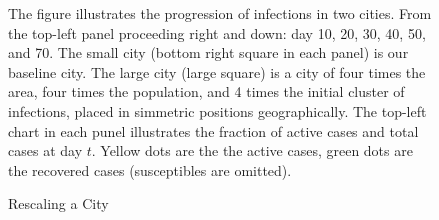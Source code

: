 \documentclass[english,11pt]{article}
\begin{document}
\begin{figure}[H]
\caption{Rescaling a City}
\begin{threeparttable}
\centering
{}
    \begin{tablenotes}
        \setlength{\itemindent}{-0.2em}
        \footnotesize
        \item
    The figure illustrates the progression of infections in two cities. From the top-left panel proceeding right and down: day 10, 20, 30, 40, 50, and 70. The small city (bottom right square in each panel) is our baseline city. The large city (large square) is a city of four times the area, four times the population, and 4 times the initial cluster of infections, placed in simmetric positions geographically. The top-left chart in each punel illustrates the fraction of active cases and total cases at day $t$. Yellow dots are the the active cases, green dots are the recovered cases (susceptibles are omitted). 
    \end{tablenotes}
\end{threeparttable}    
\label{fig:2sizes}
\end{figure}
\end{document}
